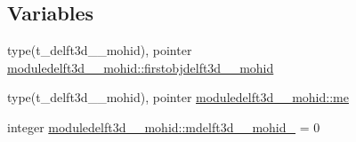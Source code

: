 \subsection*{Variables}
\begin{DoxyCompactItemize}
\item 
type(t\+\_\+delft3d\+\_\+\_\+mohid), pointer \mbox{\hyperlink{namespacemoduledelft3d__2__mohid_af1b4c3216212abbf986929fa7c978543}{moduledelft3d\+\_\+\_\+mohid\+::firstobjdelft3d\+\_\+\_\+mohid}}
\item 
type(t\+\_\+delft3d\+\_\+\_\+mohid), pointer \mbox{\hyperlink{namespacemoduledelft3d__2__mohid_a3cd2049e28b3f96571671db89a326800}{moduledelft3d\+\_\+\_\+mohid\+::me}}
\item 
integer \mbox{\hyperlink{namespacemoduledelft3d__2__mohid_a39591cd13432bc8e58a1892e3f7dc6a8}{moduledelft3d\+\_\+\_\+mohid\+::mdelft3d\+\_\+\_\+mohid\+\_\+}} = 0
\end{DoxyCompactItemize}
